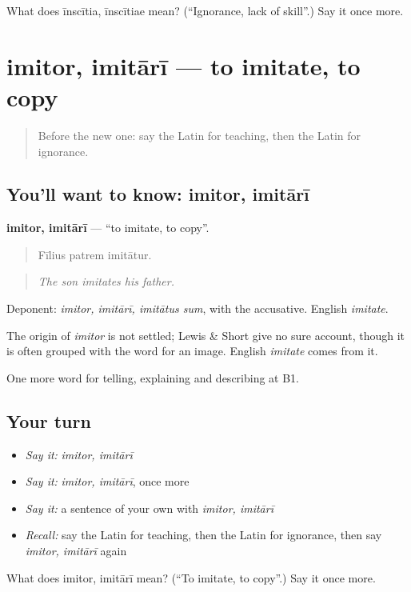 \begin{tcolorbox}[breakable,colback=teal!4,colframe=teal!35!black,title={Before you move on}]
What does īnscītia, īnscītiae mean? (\textquotedblleft{}Ignorance, lack of skill\textquotedblright{}.) Say it once more.
\end{tcolorbox}
\section[imitor, imitārī]{imitor, imitārī — to imitate, to copy}

\label{lesson:LA-C407-imitor}



\begin{quote}
Before the new one: say the Latin for teaching, then the Latin for ignorance.
\end{quote}

\subsection*{You'll want to know: imitor, imitārī}
\textbf{imitor, imitārī} — \textquotedblleft{}to imitate, to copy\textquotedblright{}.

\begin{quote}
Fīlius patrem imitātur.
\end{quote}

\begin{quote}
\emph{The son imitates his father.}
\end{quote}

Deponent: \emph{imitor, imitārī, imitātus sum}, with the accusative. English \emph{imitate}.

\begin{cousinweb}
The origin of \emph{imitor} is not settled; Lewis \& Short give no sure account, though it is often grouped with the word for an image. English \emph{imitate} comes from it.
\end{cousinweb}

\begin{grammarlens}[title={What you've built}]
One more word for telling, explaining and describing at B1.
\end{grammarlens}

\subsection*{Your turn}
\begin{itemize}
\raggedright
  \item \emph{Say it:} \emph{imitor, imitārī}
  \item \emph{Say it:} \emph{imitor, imitārī}, once more
  \item \emph{Say it:} a sentence of your own with \emph{imitor, imitārī}
  \item \emph{Recall:} say the Latin for teaching, then the Latin for ignorance, then say \emph{imitor, imitārī} again
\end{itemize}

\begin{tcolorbox}[breakable,colback=teal!4,colframe=teal!35!black,title={Before you move on}]
What does imitor, imitārī mean? (\textquotedblleft{}To imitate, to copy\textquotedblright{}.) Say it once more.
\end{tcolorbox}

